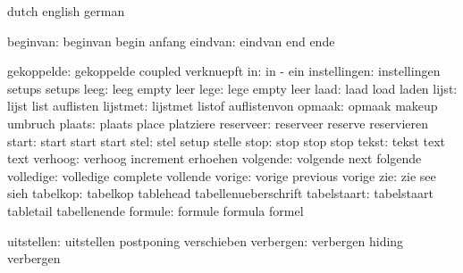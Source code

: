 
\startelements        dutch                english             german

           beginvan:  beginvan             begin               anfang
            eindvan:  eindvan              end                 ende

         gekoppelde:  gekoppelde           coupled             verknuepft
                 in:  in                   -                   ein
       instellingen:  instellingen         setups              setups %
               leeg:  leeg                 empty               leer
               lege:  lege                 empty               leer
               laad:  laad                 load                laden
              lijst:  lijst                list                auflisten
           lijstmet:  lijstmet             listof              auflistenvon
             opmaak:  opmaak               makeup              umbruch
             plaats:  plaats               place               platziere
          reserveer:  reserveer            reserve             reservieren
              start:  start                start               start
               stel:  stel                 setup               stelle
               stop:  stop                 stop                stop
              tekst:  tekst                text                text
            verhoog:  verhoog              increment           erhoehen
           volgende:  volgende             next                folgende
          volledige:  volledige            complete            vollende
             vorige:  vorige               previous            vorige
                zie:  zie                  see                 sieh
           tabelkop:  tabelkop             tablehead           tabellenueberschrift
        tabelstaart:  tabelstaart          tabletail           tabellenende
            formule:  formule              formula             formel

         uitstellen:  uitstellen           postponing          verschieben
          verbergen:  verbergen            hiding              verbergen

\stopelements




